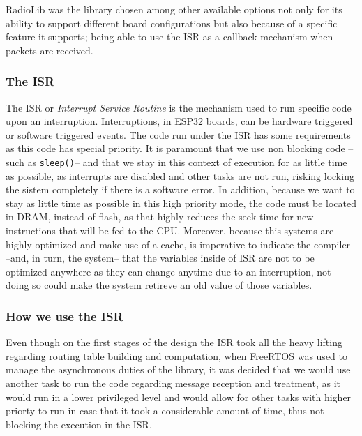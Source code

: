 RadioLib was the library chosen among other available options not only for its ability to support different board configurations but also because of a specific feature it supports; being able to use the ISR as a callback mechanism when packets are received.
\subsubsection{The ISR}
The ISR or \textit{Interrupt Service Routine} is the mechanism used to run specific code upon an interruption. Interruptions, in ESP32 boards, can be hardware triggered or software triggered events.
The code run under the ISR has some requirements as this code has special priority. It is paramount that we use non blocking code --such as \texttt{sleep()}-- and that we stay in this context of execution for as little time as possible, as interrupts are disabled and other tasks are not run, risking locking the sistem completely if there is a software error. In addition, because we want to stay as little time as possible in this high priority mode, the code must be located in DRAM, instead of flash, as that highly reduces the seek time for new instructions that will be fed to the CPU. Moreover, because this systems are highly optimized and make use of a cache, is imperative to indicate the compiler --and, in turn, the system-- that the variables inside of ISR are not to be optimized anywhere as they can change anytime due to an interruption, not doing so could make the system retireve an old value of those variables.
\subsubsection{How we use the ISR}
Even though on the first stages of the design the ISR took all the heavy lifting regarding routing table building and computation, when FreeRTOS was used to manage the asynchronous duties of the library, it was decided that we would use another task to run the code regarding message reception and treatment, as it would run in a lower privileged level and would allow for other tasks with higher priorty to run in case that it took a considerable amount of time, thus not blocking the execution in the ISR.
